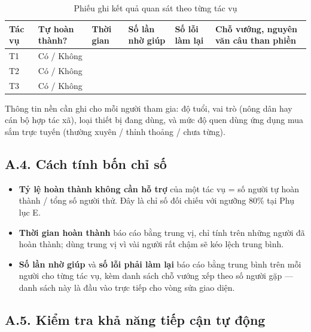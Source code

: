 \begingroup
\tblsetup\renewcommand{\arraystretch}{1.6}
\begin{table}[H]
\centering
\small
\caption{Phiếu ghi kết quả quan sát theo từng tác vụ}
\label{tab:phieu-quansat}
\begin{tabular}{L{1.13cm} L{2.26cm} L{1.95cm} L{2.05cm} L{2.05cm} L{4.40cm}}
\toprule
{}
\textbf{Tác vụ} & \textbf{Tự hoàn thành?} & \textbf{Thời gian} & \textbf{Số lần nhờ giúp} & \textbf{Số lỗi làm lại} & \textbf{Chỗ vướng, nguyên văn câu than phiền} \\
\midrule
T1 & Có / Không & \hrulefill & \hrulefill & \hrulefill & \hrulefill \\
T2 & Có / Không & \hrulefill & \hrulefill & \hrulefill & \hrulefill \\
T3 & Có / Không & \hrulefill & \hrulefill & \hrulefill & \hrulefill \\
\bottomrule
\end{tabular}
\end{table}
\endgroup

\noindent Thông tin nền cần ghi cho mỗi người tham gia: độ tuổi, vai trò (nông
dân hay cán bộ hợp tác xã), loại thiết bị đang dùng, và mức độ quen dùng ứng
dụng mua sắm trực tuyến (thường xuyên / thỉnh thoảng / chưa từng).

\subsection*{A.4. Cách tính bốn chỉ số}

\begin{itemize}
    \item \textbf{Tỷ lệ hoàn thành không cần hỗ trợ} của một tác vụ = số người tự
    hoàn thành / tổng số người thử. Đây là chỉ số đối chiếu với ngưỡng 80\% tại
    Phụ lục E.
    \item \textbf{Thời gian hoàn thành} báo cáo bằng trung vị, chỉ tính trên những
    người đã hoàn thành; dùng trung vị vì vài người rất chậm sẽ kéo lệch trung
    bình.
    \item \textbf{Số lần nhờ giúp} và \textbf{số lỗi phải làm lại} báo cáo bằng
    trung bình trên mỗi người cho từng tác vụ, kèm danh sách chỗ vướng xếp theo
    số người gặp --- danh sách này là đầu vào trực tiếp cho vòng sửa giao diện.
\end{itemize}

\subsection*{A.5. Kiểm tra khả năng tiếp cận tự động}

